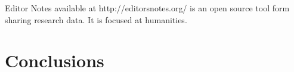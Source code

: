 \documentclass{sig-alternate-05-2015}
\begin{document}
Editor Notes\cite{buckland_open_2015}  available at http://editorsnotes.org/ is an open source tool form sharing research data.  It is focused at humanities.

\section{Conclusions}

%

%
\end{document}

